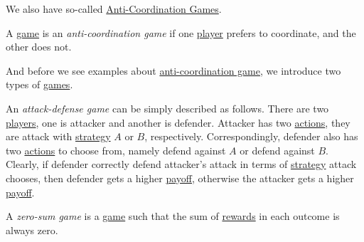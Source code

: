 We also have so-called \hyperref[def:anti-coordination-game]{Anti-Coordination Games}.
\begin{definition}\label{def:anti-coordination-game}
	A  \hyperref[def:game]{game} is an \emph{anti-coordination game} if one \hyperref[def:player]{player} prefers to coordinate, and the other does not.
\end{definition}

And before we see examples about \hyperref[def:anti-coordination-game]{anti-coordination game}, we introduce two types of \hyperref[def:game]{games}.

\begin{definition}\label{def:attach-defense-game}
	An \emph{attack-defense game} can be simply described as follows. There are two \hyperref[def:player]{players}, one is attacker and another is defender.
	Attacker has two \hyperref[def:strategy]{actions}, they are attack with \hyperref[def:strategy]{strategy} \(A\) or \(B\), respectively.
	Correspondingly, defender also has two \hyperref[def:strategy]{actions} to choose from, namely defend against \(A\) or defend against \(B\). Clearly,
	if defender correctly defend attacker's attack in terms of \hyperref[def:strategy]{strategy} attack chooses, then defender gets a higher \hyperref[def:reward]{payoff},
	otherwise the attacker gets a higher \hyperref[def:reward]{payoff}.
\end{definition}

\begin{definition}\label{def:zero-sum-game}
	A \emph{zero-sum game} is a \hyperref[def:game]{game} such that the sum of \hyperref[def:reward]{rewards} in each outcome is always zero.
\end{definition}

